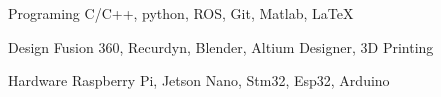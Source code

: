 

\begin{cvskills}

  \cvskill
    {Programing} %
    {C/C++, python, ROS, Git, Matlab, LaTeX} %

  \cvskill
    {Design} %
    {Fusion 360, Recurdyn, Blender, Altium Designer, 3D Printing} %

  \cvskill
    {Hardware} %
    {Raspberry Pi, Jetson Nano, Stm32, Esp32, Arduino} %



\end{cvskills}
